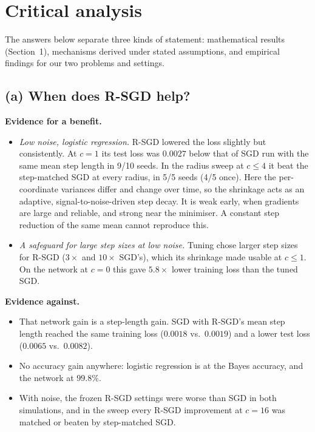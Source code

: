 \documentclass[11pt,a4paper]{article}
\begin{document}
\section{Critical analysis}\label{sec:critical}

The answers below separate three kinds of statement: mathematical results (Section~1),
mechanisms derived under stated assumptions, and empirical findings for our two problems and
settings.

\subsection{(a) When does R-SGD help?}

\textbf{Evidence for a benefit.}
\begin{itemize}
\item \emph{Low noise, logistic regression.} R-SGD lowered the loss slightly but consistently. At
$c=1$ its test loss was $0.0027$ below that of SGD run with the same mean step length in 9/10
seeds. In the radius sweep at $c\le4$ it beat the step-matched SGD at every radius, in 5/5 seeds (4/5 once).
Here the per-coordinate variances differ and change over time, so the shrinkage acts as an
adaptive, signal-to-noise-driven step decay. It is weak early, when gradients are large and
reliable, and strong near the minimiser. A constant step reduction of the same mean cannot
reproduce this.
\item \emph{A safeguard for large step sizes at low noise.} Tuning chose larger step sizes for
R-SGD ($3\times$ and $10\times$ SGD's), which its shrinkage made usable at $c\le1$. On the network
at $c=0$ this gave $5.8\times$ lower training loss than the tuned SGD.
\end{itemize}

\textbf{Evidence against.}
\begin{itemize}
\item That network gain is a step-length gain. SGD with R-SGD's mean step length reached the same
training loss ($0.0018$ vs.\ $0.0019$) and a lower test loss ($0.0065$ vs.\ $0.0082$).
\item No accuracy gain anywhere: logistic regression is at the Bayes accuracy, and the network at
$99.8\%$.
\item With noise, the frozen R-SGD settings were worse than SGD in both simulations, and in the
sweep every R-SGD improvement at $c=16$ was matched or beaten by step-matched SGD.
\end{itemize}
\end{document}
